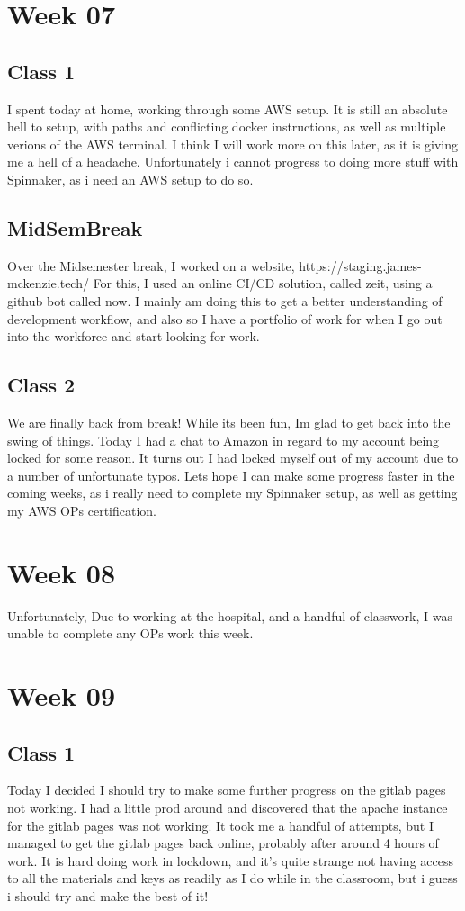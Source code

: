 \documentclass{article}
\begin{document}
\section{Week 07}
\subsection{Class 1}
I spent today at home, working through some AWS setup. It is still an absolute hell to setup, with paths and conflicting docker instructions, 
as well as multiple verions of the AWS terminal. I think I will work more on this later, as it is giving me a hell of a headache. Unfortunately
i cannot progress to doing more stuff with Spinnaker, as i need an AWS setup to do so.
\subsection*{MidSemBreak}
Over the Midsemester break, I worked on a website, https://staging.james-mckenzie.tech/ For this, I used an online CI/CD solution,
called zeit, using a github bot called now. I mainly am doing this to get a better understanding of development workflow, and also so I
have a portfolio of work for when I go out into the workforce and start looking for work.
\subsection{Class 2}
We are finally back from break! While its been fun, Im glad to get back into the swing of things. Today I had a chat to
Amazon in regard to my account being locked for some reason. It turns out I had locked myself out of my account due to a number
of unfortunate typos. Lets hope I can make some progress faster in the coming weeks, as i really need to complete my Spinnaker setup,
as well as getting my AWS OPs certification. 

\section{Week 08}
Unfortunately, Due to working at the hospital, and a handful of classwork, I was unable to complete any OPs work this week. 
\section{Week 09}
\subsection {Class 1}
Today I decided I should try to make some further progress on the gitlab pages not working. I had a little prod around and discovered that
the apache instance for the gitlab pages was not working. It took me a handful of attempts, but I managed to get the gitlab pages back 
online, probably after around 4 hours of work. It is hard doing work in lockdown, and it's quite strange not having access to all the materials
and keys as readily as I do while in the classroom, but i guess i should try and make the best of it!
\end{document}
